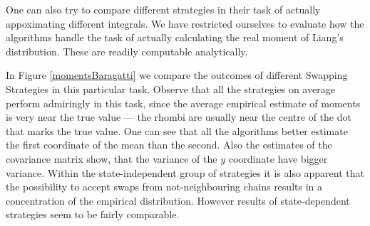 One can also try to compare different strategies in their task of actually appoximating different integrals. We have restricted ourselves to evaluate how the algorithms handle the task of actually calculating the real moment of Liang's distribution. These are readily computable analytically. 

In Figure \ref{momentsBaragatti} we compare the outcomes of different Swapping Strategies in this particular task. Observe that all the strategies on average perform admiringly in this task, since the average empirical estimate of moments is very near the true value --- the rhombi are usually near the centre of the dot that marks the true value. One can see that all the algorithms better estimate the first coordinate of the mean than the second. Also the estimates of the covariance matrix show, that the variance of the $y$ coordinate have bigger variance. Within the state-independent group of strategies it is also apparent that the possibility to accept swaps from not-neighbouring chains results in a concentration of the empirical distribution. However results of state-dependent strategies seem to be fairly comparable. 

